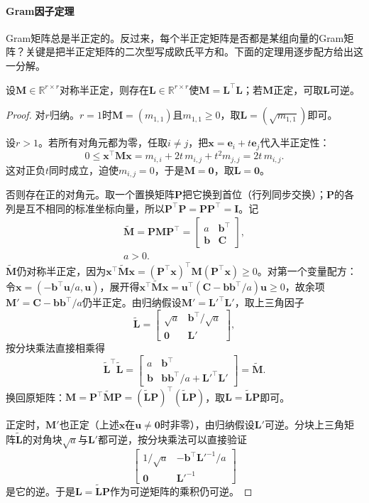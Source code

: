 \paragraph{Gram因子定理}
Gram矩阵总是半正定的。反过来，每个半正定矩阵是否都是某组向量的Gram矩阵？关键是把半正定矩阵的二次型写成欧氏平方和。下面的定理用逐步配方给出这一分解。
\begin{theorem}[半正定矩阵的配方因子]
\label{thm:ls-gram-factor}
设$\bm M\in\mathbb R^{r\times r}$对称半正定，则存在$\bm L\in\mathbb R^{r\times r}$使$\bm M=\bm L^\top\bm L$；若$\bm M$正定，可取$\bm L$可逆。
\end{theorem}
\begin{proof}
对$r$归纳。$r=1$时$\bm M=(m_{1,1})$且$m_{1,1}\geq0$，取$\bm L=(\sqrt{m_{1,1}})$即可。

设$r>1$。若所有对角元都为零，任取$i\neq j$，把$\bm x=\bm e_i+t\bm e_j$代入半正定性：
\[
 0\leq\bm x^\top\bm M\bm x=m_{i,i}+2t\,m_{i,j}+t^2m_{j,j}=2t\,m_{i,j}.
\]
这对正负$t$同时成立，迫使$m_{i,j}=0$，于是$\bm M=\bm0$，取$\bm L=\bm0$。

否则存在正的对角元。取一个置换矩阵$\bm P$把它换到首位（行列同步交换）；$\bm P$的各列是互不相同的标准坐标向量，所以$\bm P^\top\bm P=\bm P\bm P^\top=\bm I$。记
\[
\begin{gathered}
\widetilde{\bm M}=\bm P\bm M\bm P^\top
 =\begin{bmatrix}a&\bm b^\top\\ \bm b&\bm C\end{bmatrix},\\
a>0.
\end{gathered}
\]
$\widetilde{\bm M}$仍对称半正定，因为$\bm x^\top\widetilde{\bm M}\bm x=(\bm P^\top\bm x)^\top\bm M(\bm P^\top\bm x)\geq0$。对第一个变量配方：令$\bm x=(-\bm b^\top\bm u/a,\bm u)$，展开得$\bm x^\top\widetilde{\bm M}\bm x=\bm u^\top(\bm C-\bm b\bm b^\top/a)\bm u\geq0$，故余项$\bm M'=\bm C-\bm b\bm b^\top/a$仍半正定。由归纳假设$\bm M'=\bm L'^\top\bm L'$，取上三角因子
\[
 \widetilde{\bm L}=\begin{bmatrix}\sqrt a&\bm b^\top/\sqrt a\\ \bm0&\bm L'\end{bmatrix},
\]
按分块乘法直接相乘得
\[
 \widetilde{\bm L}^\top\widetilde{\bm L}
 =\begin{bmatrix}a&\bm b^\top\\ \bm b&\bm b\bm b^\top/a+\bm L'^\top\bm L'\end{bmatrix}
 =\widetilde{\bm M}.
\]
换回原矩阵：$\bm M=\bm P^\top\widetilde{\bm M}\bm P=(\widetilde{\bm L}\bm P)^\top(\widetilde{\bm L}\bm P)$，取$\bm L=\widetilde{\bm L}\bm P$即可。

正定时，$\bm M'$也正定（上述$\bm x$在$\bm u\neq\bm0$时非零），由归纳假设$\bm L'$可逆。分块上三角矩阵$\widetilde{\bm L}$的对角块$\sqrt a$与$\bm L'$都可逆，按分块乘法可以直接验证
\[
 \begin{bmatrix}1/\sqrt a&-\bm b^\top\bm L'^{-1}/a\\ \bm0&\bm L'^{-1}\end{bmatrix}
\]
是它的逆。于是$\bm L=\widetilde{\bm L}\bm P$作为可逆矩阵的乘积仍可逆。
\end{proof}
